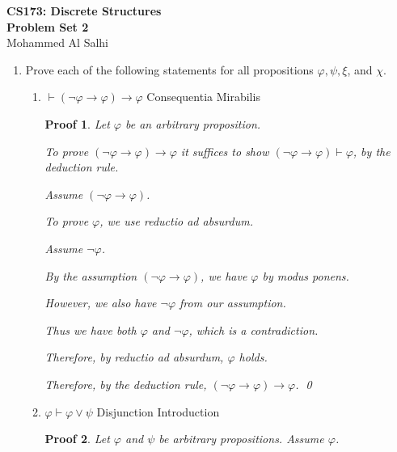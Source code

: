 \documentclass[12pt]{article}
\theoremstyle{proofstyle}
\newtheorem*{proof*}{Proof}
\let\oldquote\quote
\let\oldendquote\endquote
\renewenvironment{quote}
    {\oldquote\setlength{\parskip}{0.2em}}
    {\oldendquote}
\renewcommand{\maketitle}{%
  \begin{flushleft}
    {\Large\bfseries CS173: Discrete Structures}\\[0.3em]
    {\Large\bfseries Problem Set 2}\\[0.5em]
    {\normalsize Mohammed Al Salhi}
  \end{flushleft}
  \vspace{1em}
}
\begin{document}
\maketitle

\begin{enumerate}[left=0pt, itemsep=2em, parsep=1em]

\item Prove each of the following statements for all propositions $\varphi, \psi, \xi$, and $\chi$.

\begin{enumerate}[label=(\alph*), itemsep=1.5em, leftmargin=2em]

\item $\vdash (\neg\varphi \to \varphi) \to \varphi$ \hfill Consequentia Mirabilis

\begin{proof*}
    Let $\varphi$ be an arbitrary proposition.
    
    To prove $(\neg\varphi \to \varphi) \to \varphi$ it suffices to show $(\neg\varphi \to \varphi) \vdash \varphi$, by the deduction rule.
    
    \begin{quote}
        Assume $(\neg\varphi \to \varphi)$.
        
        To prove $\varphi$, we use reductio ad absurdum.

        \begin{quote}
        Assume $\neg\varphi$.
        
        By the assumption $(\neg\varphi \to \varphi)$, we have $\varphi$ by modus ponens.
        
        However, we also have $\neg\varphi$ from our assumption.
        
        Thus we have both $\varphi$ and $\neg\varphi$, which is a contradiction.

        \end{quote}
        
        Therefore, by reductio ad absurdum, $\varphi$ holds.
         
    \end{quote}
    
    Therefore, by the deduction rule, $(\neg\varphi \to \varphi) \to \varphi$. \qed
\end{proof*}

\item $\varphi \vdash \varphi \vee \psi$ \hfill Disjunction Introduction

\begin{proof*}
    Let $\varphi$ and $\psi$ be arbitrary propositions. Assume $\varphi$.


\end{proof*}
\end{enumerate}
\end{enumerate}
\end{document}
